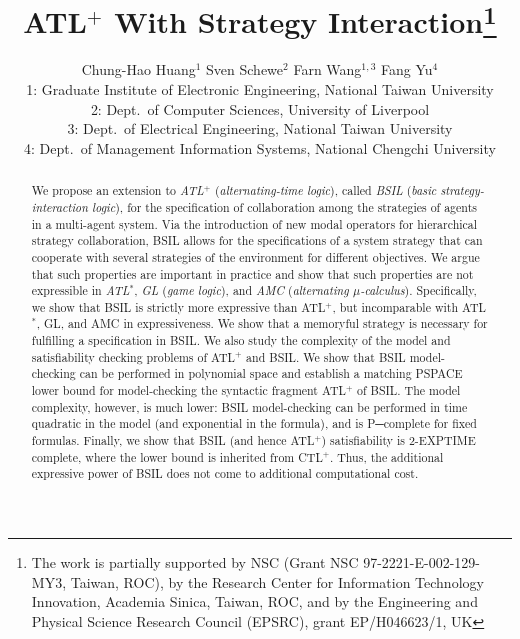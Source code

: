 \documentclass[11pt]{article}
\begin{document}
\title{ATL$^+$ With Strategy Interaction\thanks{
The work is partially supported by NSC (Grant NSC 97-2221-E-002-129-MY3, Taiwan, ROC),
by the Research Center for Information Technology Innovation, Academia Sinica,
Taiwan, ROC, and by the
Engineering and Physical Science Research Council (EPSRC), grant EP/H046623/1, UK}  
}

\author{Chung-Hao Huang$^{1}$ \hspace*{5mm} 
Sven Schewe{$^2$} \hspace*{5mm} 
Farn Wang$^{1,3}$ \hspace*{5mm} 
Fang Yu$^{4}$ \\[5mm] 
1: Graduate Institute of Electronic Engineering, National Taiwan University\\
2: Dept.\ of Computer Sciences, University of Liverpool\\
3: Dept.\ of Electrical Engineering, National Taiwan University \\
4: Dept.\ of Management Information Systems, National Chengchi University
}


\maketitle
\thispagestyle{empty}
\pagestyle{plain}
\baselineskip 18pt

\begin{abstract}
We propose an extension to {\em ATL$^+$} ({\em alternating-time logic}), 
called {\em BSIL} ({\em basic strategy-interaction logic}), 
for the specification of collaboration among the strategies of agents in a multi-agent system.  
Via the introduction of new modal operators for hierarchical strategy collaboration, 
BSIL allows for the specifications of a system strategy 
that can cooperate with several strategies of the environment for different objectives.  
We argue that such properties are important in practice 
and show that such properties are not expressible in 
{\em ATL$^*$}, 
{\em GL} ({\em game logic}), and 
{\em AMC} ({\em alternating $\mu$-calculus}). 
Specifically, we show that BSIL is strictly more expressive than ATL$^+$, 
but incomparable with ATL$^*$, GL, and AMC in expressiveness.  
We show that a memoryful strategy is
necessary for fulfilling a specification in BSIL.  
%
We also study the complexity of the model and satisfiability checking problems 
of ATL$^+$ and BSIL.
We show that BSIL model-checking can be performed in polynomial space and establish a matching PSPACE lower bound for model-checking the syntactic fragment ATL$^+$ of BSIL.
The model complexity, however, is much lower: BSIL model-checking can be performed in time quadratic in the model (and exponential in the formula), and is P─complete for fixed formulas.
Finally, we show that BSIL (and hence ATL$^+$) satisfiability is 2-EXPTIME complete, where the lower bound is inherited from CTL$^+$.
Thus, the additional expressive power of BSIL does not come to additional computational cost.
\end{abstract}
\end{document}
